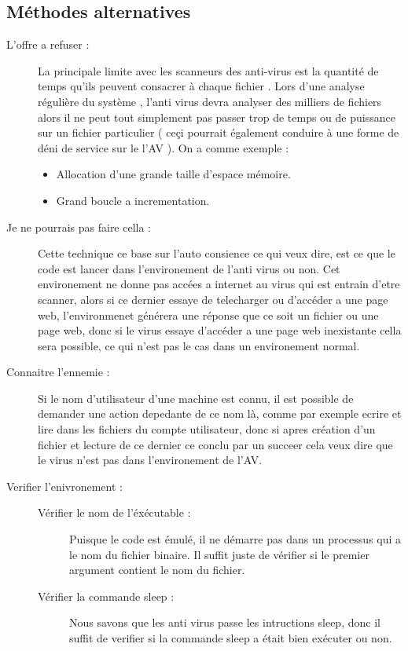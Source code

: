     \subsection{Méthodes alternatives}
    \begin{description}
        \item[L'offre a refuser :] La principale limite avec les scanneurs des anti-virus est la quantité de temps qu'ils peuvent consacrer à chaque fichier . Lors d'une analyse régulière du système , l'anti virus devra analyser des milliers de fichiers alors il ne peut tout simplement pas passer trop de temps ou de puissance sur un fichier particulier ( ceçi pourrait également conduire à une forme de déni de service sur le l'AV ). On a comme exemple :
        \begin{itemize}
            \item Allocation d'une grande taille d'espace mémoire.
            \item Grand boucle a incrementation.
        \end{itemize}

        \item[Je ne pourrais pas faire cella :] Cette technique ce base sur l'auto consience ce qui veux dire, est ce que le code est lancer dans l'environement de l'anti virus ou non.
            Cet environement ne donne pas accées a internet au virus qui est entrain d'etre scanner, alors si ce dernier essaye de telecharger ou d'accéder a une page web, l'environmenet générera une réponse que ce soit un fichier ou une page web,
            donc si le virus essaye d'accéder a une page web inexistante cella sera possible, ce qui n'est pas le cas dans un environement normal.

        \item[Connaitre l'ennemie :] Si le nom d'utilisateur d'une machine est connu, il est possible de demander une action depedante de ce nom là, comme par exemple ecrire et lire dans les fichiers du compte utilisateur, donc si apres création d'un fichier et lecture de ce dernier ce conclu par un succeer cela veux dire que le virus n'est pas dans l'environement de l'AV.

        \item[Verifier l'enivronement :]
        \begin{description}
            \item[Vérifier le nom de l'éxécutable :] Puisque le code est émulé, il ne démarre pas dans un processus qui a le nom du fichier binaire. Il suffit juste de vérifier si le premier argument contient le nom du fichier.

            \item[Vérifier la commande sleep :] Nous savons que les anti virus passe les intructions sleep, donc il suffit de verifier si la commande sleep a était bien exécuter ou non.
        \end{description}
    \end{description}
